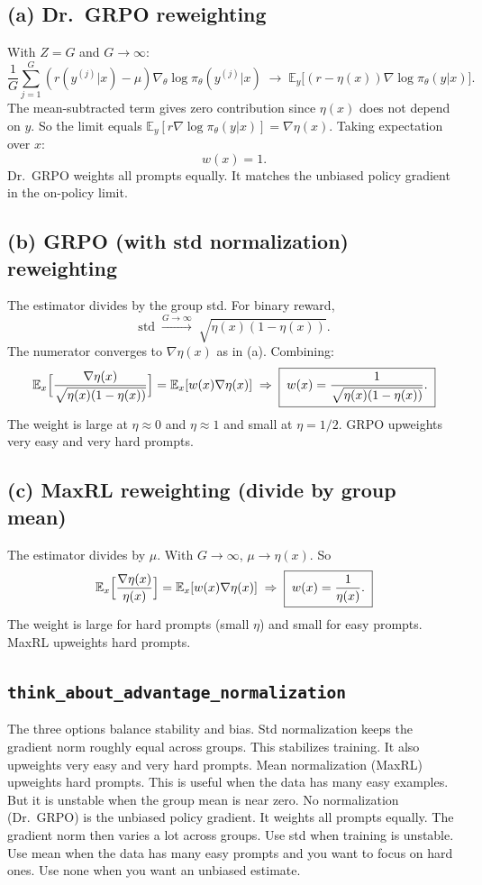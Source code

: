 \documentclass[11pt]{article}
\newcommand{\E}{\mathbb{E}}
\newcommand{\policy}{\pi_\theta}
\newcommand{\problemid}[1]{\subsection*{\nolinkurl{#1}}}
\begin{document}
\subsection*{(a) Dr.\ GRPO reweighting}

With $Z=G$ and $G\to\infty$:
\[
\frac{1}{G}\sum_{j=1}^G (r(y^{(j)}|x) - \mu)\nabla_\theta\log\policy(y^{(j)}|x) \;\longrightarrow\; \E_y\bigl[(r - \eta(x))\nabla\log\policy(y|x)\bigr].
\]
The mean-subtracted term gives zero contribution since $\eta(x)$ does not
depend on $y$. So the limit equals
$\E_y[r\nabla\log\policy(y|x)] = \nabla\eta(x)$. Taking expectation over $x$:
\[
\boxed{\;w(x) = 1.\;}
\]
Dr.\ GRPO weights all prompts equally. It matches the unbiased policy gradient
in the on-policy limit.

\subsection*{(b) GRPO (with std normalization) reweighting}

The estimator divides by the group std. For binary reward,
\[
\text{std}\;\xrightarrow{G\to\infty}\; \sqrt{\eta(x)(1-\eta(x))}.
\]
The numerator converges to $\nabla\eta(x)$ as in (a). Combining:
\[
\E_x\Bigl[\frac{\nabla\eta(x)}{\sqrt{\eta(x)(1-\eta(x))}}\Bigr]
= \E_x[w(x)\nabla\eta(x)] \;\Rightarrow\;
\boxed{\;w(x) = \frac{1}{\sqrt{\eta(x)(1-\eta(x))}}.\;}
\]
The weight is large at $\eta\approx 0$ and $\eta\approx 1$ and small at
$\eta=1/2$. GRPO upweights very easy and very hard prompts.

\subsection*{(c) MaxRL reweighting (divide by group mean)}

The estimator divides by $\mu$. With $G\to\infty$, $\mu \to \eta(x)$. So
\[
\E_x\Bigl[\frac{\nabla\eta(x)}{\eta(x)}\Bigr]
= \E_x[w(x)\nabla\eta(x)] \;\Rightarrow\;
\boxed{\;w(x) = \frac{1}{\eta(x)}.\;}
\]
The weight is large for hard prompts (small $\eta$) and small for easy prompts.
MaxRL upweights hard prompts.

\problemid{think_about_advantage_normalization}

The three options balance stability and bias. Std normalization keeps the
gradient norm roughly equal across groups. This stabilizes training. It also
upweights very easy and very hard prompts. Mean normalization (MaxRL) upweights
hard prompts. This is useful when the data has many easy examples. But it is
unstable when the group mean is near zero. No normalization (Dr.\ GRPO) is the
unbiased policy gradient. It weights all prompts equally. The gradient norm
then varies a lot across groups. Use std when training is unstable. Use mean
when the data has many easy prompts and you want to focus on hard ones. Use
none when you want an unbiased estimate.
\end{document}
